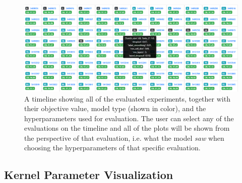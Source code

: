 \begin{figure}
	\begin{center}
		\includegraphics[width=1.0\textwidth]{images/timeline-view.png}
		\caption{A timeline showing all of the evaluated experiments, together with their objective value, model type (shown in color), and the hyperparameters used for evaluation. The user can select any of the evaluations on the timeline and all of the plots will be shown from the perspective of that evaluation, i.e. what the model \emph{saw} when choosing the hyperparameters of that specific evaluation.}
		\label{figure:timeline-view}
	\end{center}
\end{figure}


\subsection{Kernel Parameter Visualization}
\label{section:kernel-parameter-visualization}

